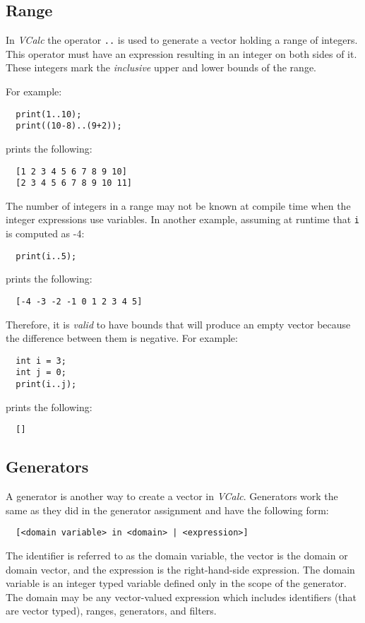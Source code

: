 \documentclass{article}
\newcommand{\code}[1]{\texttt{\textmd{#1}}}
\begin{document}
\subsection{Range}
In \textit{VCalc} the operator \code{..} is used to generate a vector holding a range of integers.
This operator must have an expression resulting in an integer on both sides of it. These integers
mark the \textit{inclusive} upper and lower bounds of the range.

For example:
\begin{lstlisting}
  print(1..10);
  print((10-8)..(9+2));
\end{lstlisting}

prints the following:
\begin{lstlisting}
  [1 2 3 4 5 6 7 8 9 10]
  [2 3 4 5 6 7 8 9 10 11]
\end{lstlisting}

The number of integers in a range may not be known at compile time when the integer expressions use
variables. In another example, assuming at runtime that \code{i} is computed as -4:
\begin{lstlisting}
  print(i..5);
\end{lstlisting}

prints the following:
\begin{lstlisting}
  [-4 -3 -2 -1 0 1 2 3 4 5]
\end{lstlisting}

Therefore, it is \textit{valid} to have bounds that will produce an empty vector because the
difference between them is negative. For example:
\begin{lstlisting}
  int i = 3;
  int j = 0;
  print(i..j);
\end{lstlisting}

prints the following:
\begin{lstlisting}
  []
\end{lstlisting}

\subsection{Generators}
A generator is another way to create a vector in \textit{VCalc}. Generators work the same as they
did in the generator assignment and have the following form:
\begin{lstlisting}
  [<domain variable> in <domain> | <expression>]
\end{lstlisting}
The identifier is referred to as the domain variable, the vector is the domain or domain vector,
and the expression is the right-hand-side expression. The domain variable is an integer typed
variable defined only in the scope of the generator. The domain may be any vector-valued expression
which includes identifiers (that are vector typed), ranges, generators, and filters.
\end{document}
